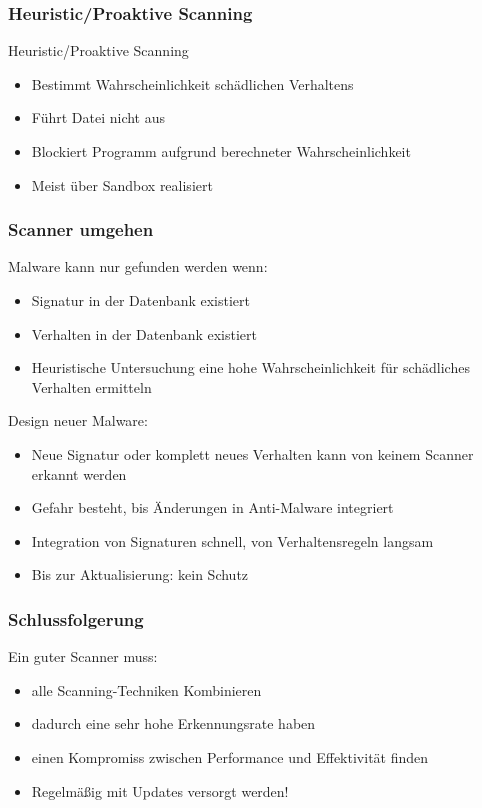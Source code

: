 \documentclass{beamer}
\begin{document}
\begin{frame}
\frametitle{Heuristic/Proaktive Scanning}
\begin{block}{Heuristic/Proaktive Scanning}
	\begin{itemize}
		\item Bestimmt Wahrscheinlichkeit schädlichen Verhaltens
		\item Führt Datei nicht aus
		\item Blockiert Programm aufgrund berechneter Wahrscheinlichkeit
		\item Meist über Sandbox realisiert
	\end{itemize}
\end{block} 
\end{frame}

\begin{frame}
	\frametitle{Scanner umgehen}
	Malware kann nur gefunden werden wenn:
	\begin{itemize}
		\item Signatur in der Datenbank existiert
		\item Verhalten in der Datenbank existiert
		\item Heuristische Untersuchung eine hohe Wahrscheinlichkeit für schädliches Verhalten ermitteln
	\end{itemize}
	\pause
	Design neuer Malware:
	\begin{itemize}
		\item Neue Signatur oder komplett neues Verhalten kann von keinem Scanner erkannt werden
		\item Gefahr besteht, bis Änderungen in Anti-Malware integriert
		\item Integration von Signaturen schnell, von Verhaltensregeln langsam
		\item Bis zur Aktualisierung: kein Schutz
	\end{itemize}
\end{frame}



\begin{frame}
	\frametitle{Schlussfolgerung}
	Ein guter Scanner muss:
	\begin{itemize}
		\item alle Scanning-Techniken Kombinieren
		\item dadurch eine sehr hohe Erkennungsrate haben
		\item einen Kompromiss zwischen Performance und Effektivität finden
		\item Regelmäßig mit Updates versorgt werden!
	\end{itemize}
\end{frame}
\end{document}
